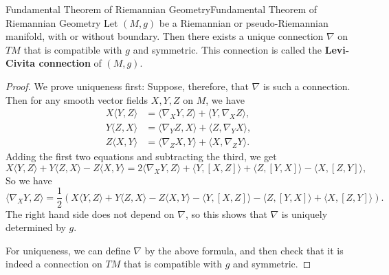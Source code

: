 \documentclass[../main.tex]{subfiles}
\begin{document}
\begin{theorem}{Fundamental Theorem of Riemannian Geometry}{Fundamental Theorem of Riemannian Geometry}
	Let $(M, g)$ be a Riemannian or pseudo-Riemannian manifold, with or without boundary. Then there exists a unique connection $\nabla$ on $TM$ that is compatible with $g$ and symmetric. This connection is called the \textbf{Levi-Civita connection} of $(M, g)$.
\end{theorem}
\begin{proof}
	We prove uniqueness first: Suppose, therefore, that $\nabla$ is such a connection. Then for any smooth vector fields $X, Y, Z$ on $M$, we have
	\begin{equation*}
		\begin{aligned}
			X\langle Y, Z \rangle & = \langle \nabla_X Y, Z \rangle + \langle Y, \nabla_X Z \rangle, \\
			Y\langle Z, X \rangle & = \langle \nabla_Y Z, X \rangle + \langle Z, \nabla_Y X \rangle, \\
			Z\langle X, Y \rangle & = \langle \nabla_Z X, Y \rangle + \langle X, \nabla_Z Y \rangle.
		\end{aligned}
	\end{equation*}
	Adding the first two equations and subtracting the third, we get
	\begin{equation*}
		X\langle Y, Z \rangle + Y\langle Z, X \rangle - Z\langle X, Y \rangle = 2\langle \nabla_X Y, Z \rangle + \langle Y, [X, Z] \rangle + \langle Z, [Y, X] \rangle - \langle X, [Z, Y] \rangle,
	\end{equation*}
	So we have
	\begin{equation} \label{eq:Levi-Civita-uniqueness}
		\langle \nabla_X Y, Z \rangle = \frac{1}{2} \left( X\langle Y, Z \rangle + Y\langle Z, X \rangle - Z\langle X, Y \rangle - \langle Y, [X, Z] \rangle - \langle Z, [Y, X] \rangle + \langle X, [Z, Y] \rangle \right).
	\end{equation}
	The right hand side does not depend on $\nabla$, so this shows that $\nabla$ is uniquely determined by $g$.

	For uniqueness, we can define $\nabla$ by the above formula, and then check that it is indeed a connection on $TM$ that is compatible with $g$ and symmetric.
\end{proof}
\end{document}
